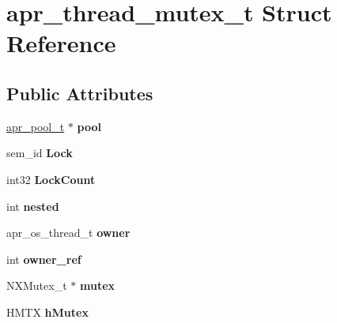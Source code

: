 \hypertarget{structapr__thread__mutex__t}{}\section{apr\+\_\+thread\+\_\+mutex\+\_\+t Struct Reference}
\label{structapr__thread__mutex__t}
\subsection*{Public Attributes}
\begin{DoxyCompactItemize}
\item 
\mbox{\label{structapr__thread__mutex__t_acbde1f1ab5bfad771024beb222439540}} 
\mbox{\hyperlink{group__apr__pools_gaf137f28edcf9a086cd6bc36c20d7cdfb}{apr\+\_\+pool\+\_\+t}} $\ast$ {\bfseries pool}
\item 
\mbox{\label{structapr__thread__mutex__t_a6ffc882dbf4acf912baae67a1514b26d}} 
sem\+\_\+id {\bfseries Lock}
\item 
\mbox{\label{structapr__thread__mutex__t_a3e8009fdfb54c72bc4d252486f131fa1}} 
int32 {\bfseries Lock\+Count}
\item 
\mbox{\label{structapr__thread__mutex__t_ad3ad636b850e7da65ac876d30f5bf467}} 
int {\bfseries nested}
\item 
\mbox{\label{structapr__thread__mutex__t_aa13a29023bf3320da5eeb643e3e8c4de}} 
apr\+\_\+os\+\_\+thread\+\_\+t {\bfseries owner}
\item 
\mbox{\label{structapr__thread__mutex__t_a4a95216b24543575da93a59de1e65398}} 
int {\bfseries owner\+\_\+ref}
\item 
\mbox{\label{structapr__thread__mutex__t_a8ef81444858cb3730a3f4d0f0f18e4af}} 
N\+X\+Mutex\+\_\+t $\ast$ {\bfseries mutex}
\item 
\mbox{\label{structapr__thread__mutex__t_afd734c4a884997eaf8a9b701cfa603f7}} 
H\+M\+TX {\bfseries h\+Mutex}
\item 

\end{DoxyCompactItemize}
